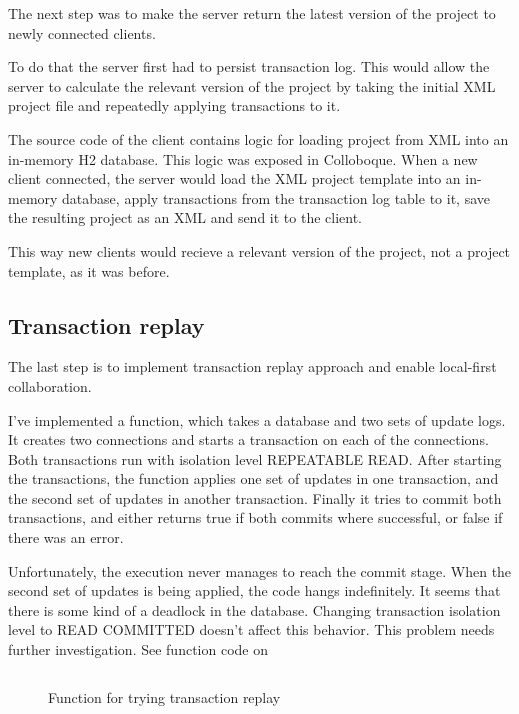 \documentclass[a4paper, 11pt, oneside]{article}
\theoremstyle{definition}
\begin{document}
The next step was to make the server return the latest version of the project to newly connected clients.

To do that the server first had to persist transaction log. This would allow the server to calculate the relevant version of the project by taking the initial XML project file and repeatedly applying transactions to it.

The source code of the client contains logic for loading project from XML into an in-memory H2 database. This logic was exposed in Colloboque. When a new client connected, the server would load the XML project template into an in-memory database, apply transactions from the transaction log table to it, save the resulting project as an XML and send it to the client. 

This way new clients would recieve a relevant version of the project, not a project template, as it was before. 

\subsection{Transaction replay}

The last step is to implement transaction replay approach and enable local-first collaboration.

I've implemented a function, which takes a database and two sets of update logs. It creates two connections and starts a transaction on each of the connections. Both transactions run with isolation level REPEATABLE READ. After starting the transactions, the function applies one set of updates in one transaction, and the second set of updates in another transaction.  Finally it tries to commit both transactions, and either returns true if both commits where successful, or false if there was an error.

Unfortunately, the execution never manages to reach the commit stage. When the second set of updates is being applied, the code hangs indefinitely. It seems that there is some kind of a deadlock in the database. Changing transaction isolation level to READ COMMITTED doesn't affect this behavior. This problem needs further investigation. See function code on 

\begin{figure}
    \inputminted[frame=single,linenos,breaklines]{kotlin}{lst/merge-concurrent-updates.kt}
    \caption{Function for trying transaction replay}
    \label{fig:merge-fun}
\end{figure}
\end{document}
